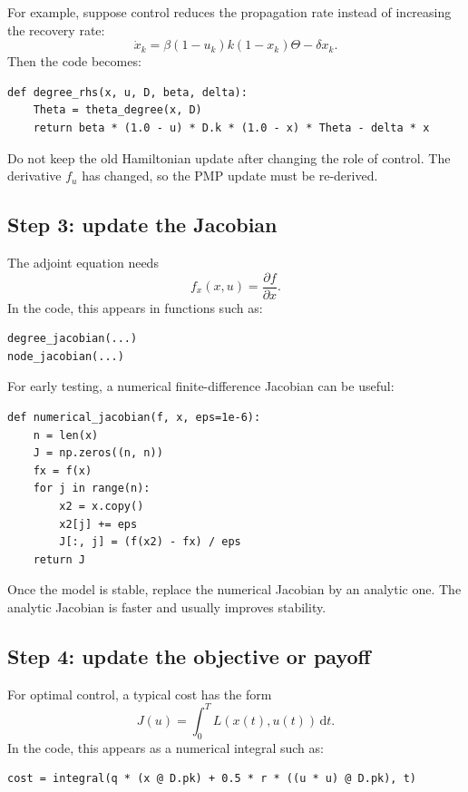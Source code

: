 \documentclass[11pt,a4paper]{article}
\newcommand{\dd}{\,\mathrm{d}}
\begin{document}
For example, suppose control reduces the propagation rate instead of increasing the recovery rate:
\[
  \dot{x}_k
  =\beta(1-u_k)k(1-x_k)\Theta-\delta x_k.
\]
Then the code becomes:

\begin{lstlisting}[style=py]
def degree_rhs(x, u, D, beta, delta):
    Theta = theta_degree(x, D)
    return beta * (1.0 - u) * D.k * (1.0 - x) * Theta - delta * x
\end{lstlisting}

Do not keep the old Hamiltonian update after changing the role of control. The derivative \(f_u\) has changed, so the PMP update must be re-derived.

\subsection{Step 3: update the Jacobian}

The adjoint equation needs
\[
  f_x(x,u)=\frac{\partial f}{\partial x}.
\]
In the code, this appears in functions such as:

\begin{lstlisting}[style=py]
degree_jacobian(...)
node_jacobian(...)
\end{lstlisting}

For early testing, a numerical finite-difference Jacobian can be useful:

\begin{lstlisting}[style=py]
def numerical_jacobian(f, x, eps=1e-6):
    n = len(x)
    J = np.zeros((n, n))
    fx = f(x)
    for j in range(n):
        x2 = x.copy()
        x2[j] += eps
        J[:, j] = (f(x2) - fx) / eps
    return J
\end{lstlisting}

Once the model is stable, replace the numerical Jacobian by an analytic one. The analytic Jacobian is faster and usually improves stability.

\subsection{Step 4: update the objective or payoff}

For optimal control, a typical cost has the form
\[
  J(u)=\int_0^T L(x(t),u(t))\dd t.
\]
In the code, this appears as a numerical integral such as:

\begin{lstlisting}[style=py]
cost = integral(q * (x @ D.pk) + 0.5 * r * ((u * u) @ D.pk), t)
\end{lstlisting}
\end{document}
